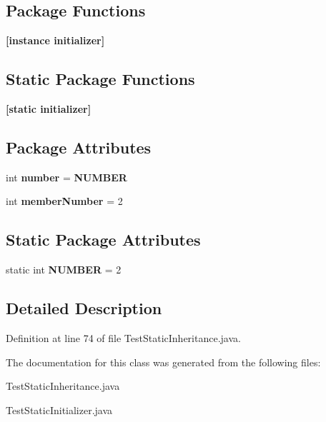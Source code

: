 \subsection*{Package Functions}
\begin{CompactItemize}
\item 
{\bf [instance initializer]}\label{classClassTwo_772efe60ade4d814a073b8e20aba72f5}

\end{CompactItemize}
\subsection*{Static Package Functions}
\begin{CompactItemize}
\item 
{\bf [static initializer]}\label{classClassTwo_9adf5e60ac5de080037534f6aa02b0f5}

\end{CompactItemize}
\subsection*{Package Attributes}
\begin{CompactItemize}
\item 
int {\bf number} = {\bf NUMBER}\label{classClassTwo_d88117ad2474599bae97dd6b638fa2cf}

\item 
int {\bf member\-Number} = 2\label{classClassTwo_d5fd754d4232a90f7e25958e59c0af84}

\end{CompactItemize}
\subsection*{Static Package Attributes}
\begin{CompactItemize}
\item 
static int {\bf NUMBER} = 2\label{classClassTwo_b279756066d6d6f6032fb9c7f7776aa7}

\end{CompactItemize}


\subsection{Detailed Description}




Definition at line 74 of file Test\-Static\-Inheritance.java.

The documentation for this class was generated from the following files:\begin{CompactItemize}
\item 
Test\-Static\-Inheritance.java\item 
Test\-Static\-Initializer.java\end{CompactItemize}
